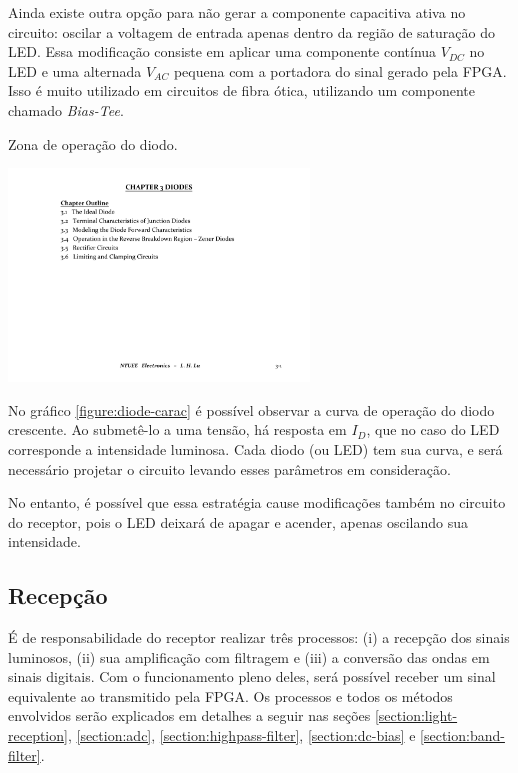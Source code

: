 	Ainda existe outra opção para não gerar a componente capacitiva ativa no circuito: oscilar a voltagem de entrada apenas dentro da região de saturação do LED. Essa modificação consiste em aplicar uma componente contínua $V_{DC}$ no LED e uma alternada $V_{AC}$ pequena com a portadora do sinal gerado pela FPGA. Isso é muito utilizado em circuitos de fibra ótica, utilizando um componente chamado \textit{Bias-Tee}.

	\begin{chart}[htb]
		\caption{\label{figure:diode-carac}Zona de operação do diodo.}
		\centering
		\includegraphics[page=5,width=0.6\textwidth, trim={16cm 2.5cm 2cm 12.5cm}, clip]{circuits/Electronics_Ch3.pdf}
	\end{chart}

	No gráfico \ref{figure:diode-carac} é possível observar a curva de operação do diodo crescente. Ao submetê-lo a uma tensão, há resposta em $I_{D}$, que no caso do LED corresponde a intensidade luminosa. Cada diodo (ou LED) tem sua curva, e será necessário projetar o circuito levando esses parâmetros em consideração.

	No entanto, é possível que essa estratégia cause modificações também no circuito do receptor, pois o LED deixará de apagar e acender, apenas oscilando sua intensidade.

	\subsection{Recepção}

	É de responsabilidade do receptor realizar três processos: (i) a recepção dos sinais luminosos, (ii) sua amplificação com filtragem e (iii) a conversão das ondas em sinais digitais. Com o funcionamento pleno deles, será possível receber um sinal equivalente ao transmitido pela FPGA. Os processos e todos os métodos envolvidos serão explicados em detalhes a seguir nas seções \ref{section:light-reception}, \ref{section:adc},  \ref{section:highpass-filter}, \ref{section:dc-bias} e \ref{section:band-filter}.

